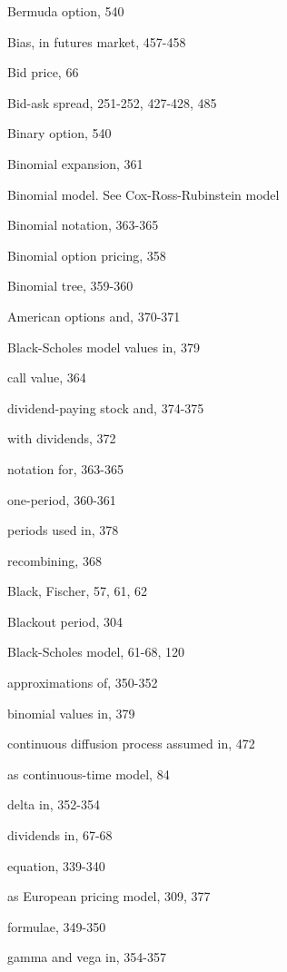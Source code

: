 \noindent Bermuda option, 540\par
\noindent Bias, in futures market, 457-458\par
\noindent Bid price, 66\par
\noindent Bid-ask spread, 251-252, 427-428, 485\par
\noindent Binary option, 540\par
\noindent Binomial expansion, 361\par
\noindent Binomial model. See Cox-Ross-Rubinstein model\par
\noindent Binomial notation, 363-365\par
\noindent Binomial option pricing, 358\par
\noindent Binomial tree, 359-360\par
\noindent American options and, 370-371\par
\noindent Black-Scholes model values in, 379\par
\noindent call value, 364\par
\noindent dividend-paying stock and, 374-375\par
\noindent with dividends, 372\par
\noindent notation for, 363-365\par
\noindent one-period, 360-361\par
\noindent periods used in, 378\par
\noindent recombining, 368\par
\noindent Black, Fischer, 57, 61, 62\par
\noindent Blackout period, 304\par
\noindent Black-Scholes model, 61-68, 120\par
\noindent approximations of, 350-352\par
\noindent binomial values in, 379\par
\noindent continuous diffusion process assumed in, 472\par
\noindent as continuous-time model, 84\par
\noindent delta in, 352-354\par
\noindent dividends in, 67-68\par
\noindent equation, 339-340\par
\noindent as European pricing model, 309, 377\par
\noindent formulae, 349-350\par
\noindent gamma and vega in, 354-357\par

